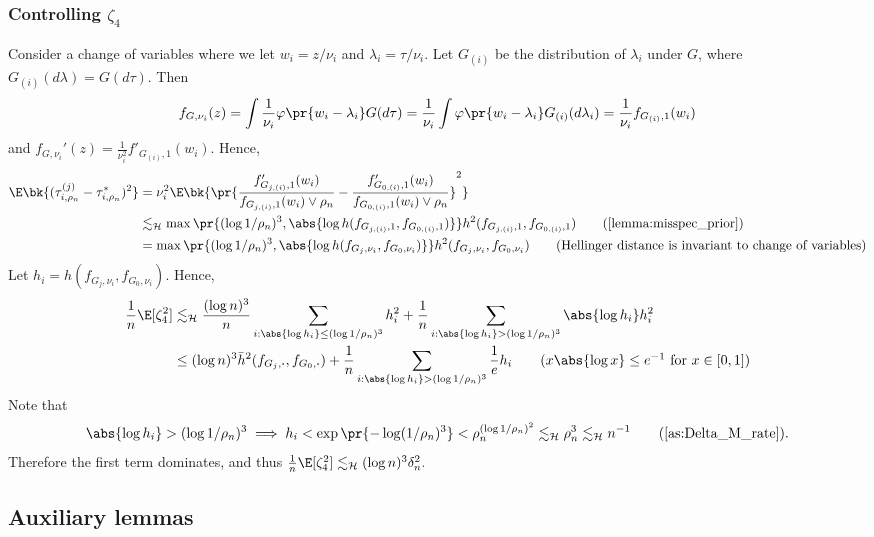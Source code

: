 \documentclass[12pt, reqno]{amsart}
\newcommand{\fs}[1]{f_{#1, \boldsymbol{\cdot}}}
\newcommand{\barh}{\bar h}
\newcommand{\leH}{\lesssim_{\mathcal{H}}}
\numberwithin{equation}{section}
\begin{document}
\begin{refsection}
\begin{appendices}
\subsubsection{Controlling $\zeta_4$}
Consider a change of variables where we let $w_i = z/\nu_i$ and $\lambda_i = \tau /
\nu_i$. Let $G_{(i)}$ be the distribution of $\lambda_i$ under $G$, where 
$
G_{(i)}(d\lambda) = G(d\tau).
$ Then \[
f_{G,\nu_i}(z) = \int \frac{1}{\nu_i} \varphi\pr{w_i - \lambda_i} G(d\tau) = \frac{1}
{\nu_i} \int \varphi\pr{w_i - \lambda_i} G_{(i)}
(d \lambda_i) = \frac{1}
{\nu_i} f_{G_{(i)}, 1}(w_i)
\]
and $
f_{G, \nu_i}'(z) = \frac{1}{\nu_i^2} f'_{G_{(i)}, 1} (w_i)
$. Hence, \begin{align*}
\E\bk{(\tau_{i, \rho_n}^{(j)} - \tau_{i, \rho_n}^*)^2} &= \nu_i^2 \E\bk{\pr{
    \frac{f'_{G_{j,(i)}, 1}(w_i)}{f_{G_{j,(i)}, 1}(w_i) \vee \rho_n} - \frac{f'_{G_{0,(i)},
    1}
    (w_i)}{f_{G_{0,(i)}, 1}(w_i) \vee \rho_n}
}^2} \\
&\leH \max\pr{(\log 1/\rho_n)^3, \abs{\log h(f_{G_{j,(i)}, 1}, f_{G_{0,(i)}, 1})}}h^2(f_{G_
{j,(i)},
1},
f_{G_{0,(i)}, 1}) \tag{\cref{lemma:misspec_prior}} \\
&= \max\pr{(\log 1/\rho_n)^3, \abs{\log h(f_
{G_j, \nu_i}, f_{G_0, \nu_i})}}h^2(f_
{G_j, \nu_i}, f_{G_0, \nu_i}) \tag{Hellinger distance is invariant to
change of variables} \end{align*}
Let $h_i = h(f_
{G_j, \nu_i}, f_{G_0, \nu_i})$. Hence, \begin{align*}
\frac{1}{n} \E[\zeta_4^2] &\leH \frac{(\log n)^3}{n} \sum_{i : \abs{\log h_i} \le 
(\log 1/\rho_n)^3} h_i^2 +
\frac{1}{n} \sum_{i : \abs{\log h_i} > (\log 1/\rho_n)^3} \abs{\log h_i} h_i^2 \\
&\le (\log n)^3 \barh^2(\fs{G_j},
\fs{G_0}) + \frac{1}{n} \sum_{i : \abs{\log h_i} >(\log 1/\rho_n)^3} \frac{1}{e} h_i 
\tag{$x\abs{\log x}
\le e^{-1}$ for $x\in[0,1]$}
\end{align*}
Note that \[ \abs{\log h_i} > (\log 1/\rho_n)^3 \implies h_i < \exp\pr{-\log(1/\rho_n)^3}
<
\rho_n^{(\log 1/\rho_n)^2} \leH \rho_n^3 \leH n^{-1} \tag{\cref{as:Delta_M_rate}}. \]
Therefore the first term dominates, and thus $
\frac{1}{n} \E[\zeta_4^2] \leH (\log n)^3 \delta_n^2.
$


\subsection{Auxiliary lemmas}

\begin{lemma}
\label{lemma:distance_bound_hard}


\end{lemma}
\end{appendices}
\end{refsection}
\end{document}
